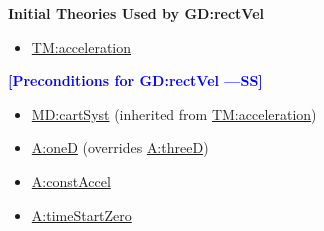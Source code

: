 \documentclass[12pt]{article}
\newcommand{\authornote}[3]{\textcolor{#1}{[#3 ---#2]}}
\newcommand{\authornote}[3]{}
\newcommand{\wss}[1]{\authornote{blue}{SS}{#1}}
\begin{document}
\noindent \textbf{Initial Theories Used by GD:rectVel}

\begin{itemize}
\item \hyperref[TM:acceleration]{TM:acceleration}
\end{itemize}

\noindent \textbf{\wss{Preconditions for GD:rectVel}}

\begin{itemize}
\item \hyperref[MD:cartSyst]{MD:cartSyst} (inherited from \hyperref[TM:acceleration]{TM:acceleration})
\item \hyperref[oneD]{A:oneD} (overrides \hyperref[threeD]{A:threeD})
\item \hyperref[constAccel]{A:constAccel}
\item \hyperref[timeStartZero]{A:timeStartZero}
\end{itemize}
\end{document}
